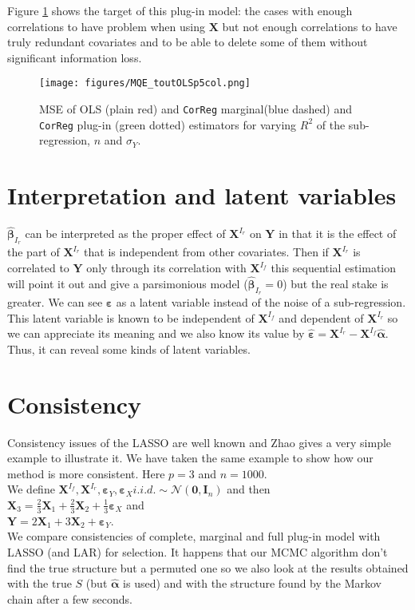 \documentclass[12pt,a4paper]{report}
\begin{document}
	Figure \ref{MQE2} shows the target of this plug-in model: the cases with enough correlations to have problem when using $\boldsymbol{X}$	but not enough correlations to have truly redundant covariates and to be able to delete some of them without significant information loss.
\begin{figure}[h!]
	\texttt{[image: figures/MQE\_toutOLSp5col.png]}\label{MQE2}
	\caption{MSE of OLS (plain red) and {\tt CorReg} marginal(blue dashed) and {\tt CorReg} plug-in (green dotted) estimators for varying $R^2$ of the sub-regression, $n$ and $\sigma_Y$.}
\end{figure}	
			
		
	\section{Interpretation and latent variables}
			$\hat{\boldsymbol{\beta}}_{I_r}$ can be interpreted as the proper effect of $\boldsymbol{X}^{I_r}$ on $\boldsymbol{Y}$ in that it is the effect of the part of $\boldsymbol{X}^{I_r}$ that is independent from other covariates. Then if $\boldsymbol{X}^{I_r}$ is correlated to $\boldsymbol{Y}$ only through its correlation with $\boldsymbol{X}^{I_f}$ this sequential estimation will point it out and give a parsimonious model ($\hat{\boldsymbol{\beta}}_{I_r}=0$) but the real stake is greater. We can see $\boldsymbol{\varepsilon}$ as a latent variable instead of the noise of a sub-regression. This latent variable is known to be independent of $\boldsymbol{X}^{I_f}$ and dependent of $\boldsymbol{X}^{I_r}$ so we can appreciate its meaning and we also know its value by $\hat{\boldsymbol{\varepsilon}}=\boldsymbol{X}^{I_r}-\boldsymbol{X}^{I_f}\hat{\boldsymbol{\alpha}}$. Thus, it can reveal some kinds of latent variables.
			
	

	\section{Consistency}\label{consistency}
		Consistency issues of the LASSO are well known and Zhao \cite{Zhao2006MSC} gives a very simple example to illustrate it.
		We have taken the same example to show how our method is more consistent.
		Here $p=3$ and $n=1000$.\\
		We define $\boldsymbol{X}^{I_f}, \boldsymbol{X}^{I_r}, \boldsymbol{\varepsilon}_Y, \boldsymbol{\varepsilon}_{X} i.i.d. \sim \mathcal{N}(\boldsymbol{0},\boldsymbol{I}_n)$ and then \\
		$\boldsymbol{X}_3=\frac{2}{3}\boldsymbol{X}_1+\frac{2}{3}\boldsymbol{X}_2+\frac{1}{3}\boldsymbol{\varepsilon}_X$ and \\
		$\boldsymbol{Y}=2\boldsymbol{X}_1+3\boldsymbol{X}_2+\boldsymbol{\varepsilon}_Y$.\\
		We compare consistencies of complete, marginal and full plug-in model with LASSO (and LAR) for selection.
		It happens that our MCMC algorithm don't find the true structure but a permuted one so we also look at the results obtained with the true $S$ (but $\hat{\boldsymbol{\alpha}}$ is used) and with the structure found by the Markov chain after a few seconds.
		
\end{document}
